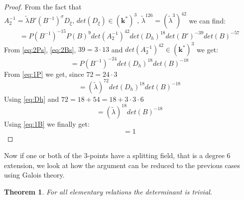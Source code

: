 \documentclass[12pt, oneside, reqno]{amsart}
\newtheorem{theorem}{Theorem}[section]
\begin{document}
\begin{proof}
From the fact that $A_2^{-1} = \tilde \lambda B' (B^{-1})^{\sigma} D_{\xi}, \, det(D_{\xi}) \in (\textbf{k}^*)^3, \, \tilde \lambda^{126} = (\tilde \lambda ^3)^{ 42}$ we can find:
\[= P(B^{-1})^{-15} P(B)^9 det(A_2^{-1})^{42} det(D_h)^{18}det(B')^{-39}det(B)^{-57}\]
From \eqref{eq:2Ps}, \eqref{eq:2Bs}, $39=3 \cdot 13$ and $ det(A_2^{-1})^{42} \in (\textbf{k}^*)^3$ we get:
\[= P(B^{-1})^{-24} det(D_h)^{18}det(B)^{-18}\]
From \eqref{eq:1P} we get, since $72 = 24 \cdot 3$
\[= (\tilde \lambda)^{72} det(D_h)^{18}det(B)^{-18}\]
Using \eqref{eq:Dh} and $72 = 18 + 54 = 18 + 3 \cdot 3 \cdot 6$
\[= (\tilde \lambda)^{18} det(B)^{-18} \]
Using \eqref{eq:1B} we finally get:
\[ = 1\]
\end{proof}
\noindent
Now if one or both of the $3$-points have a splitting field, that is a degree $6$ extension, we look at how the argument can be reduced to the previous cases using Galois theory.
\begin{theorem} \label{DetElRef}
    For all elementary relations the determinant is trivial.
\end{theorem}
\end{document}
